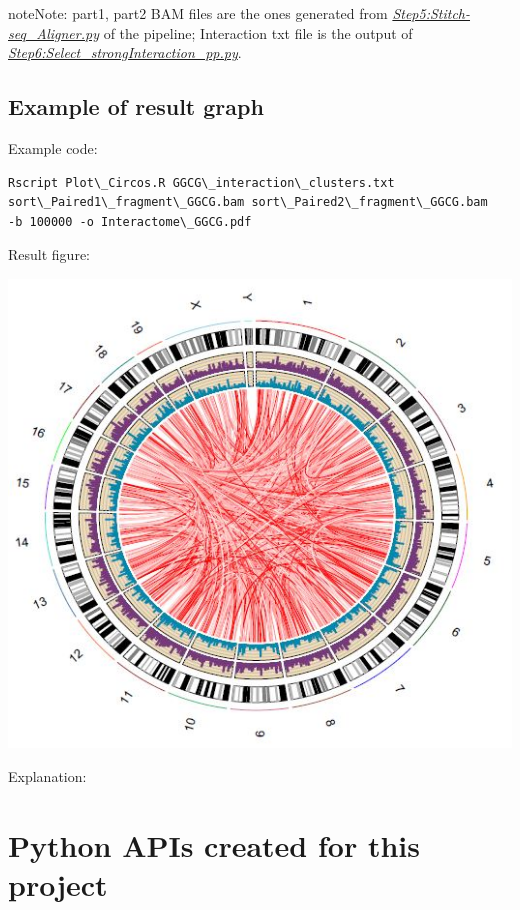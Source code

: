 \documentclass[letterpaper,10pt,english]{sphinxmanual}
\begin{document}
\begin{notice}{note}{Note:}
part1, part2 BAM files are the ones generated from {\hyperref[Analysis_pipeline:step5]{\emph{Step5:Stitch-seq\_Aligner.py}}} of the pipeline; Interaction txt file is the output of {\hyperref[Analysis_pipeline:step6]{\emph{Step6:Select\_strongInteraction\_pp.py}}}.
\end{notice}


\section{Example of result graph}
\label{Visualization:example-of-result-graph}
Example code:

\begin{Verbatim}[commandchars=\\\{\}]
Rscript Plot\_Circos.R GGCG\_interaction\_clusters.txt
sort\_Paired1\_fragment\_GGCG.bam sort\_Paired2\_fragment\_GGCG.bam
-b 100000 -o Interactome\_GGCG.pdf
\end{Verbatim}

Result figure:

\includegraphics{Interactome_GGCG.JPG}

Explanation:


\chapter{Python APIs created for this project}
\label{Other_api:python-apis-created-for-this-project}\label{Other_api::doc}
\end{document}
